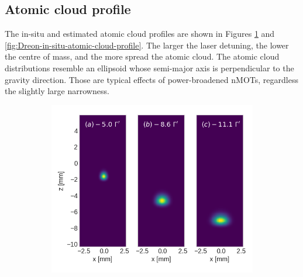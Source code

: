 \subsection{Atomic cloud profile}
\label{sec:cloud-profile-dysprosium}

The in-situ and estimated atomic cloud profiles are shown in Figures \ref{fig:Dreon-simulated-atomic-cloud-profile} and \ref{fig:Dreon-in-situ-atomic-cloud-profile}. The larger the laser detuning, the lower the centre of mass, and the more spread the atomic cloud. The atomic cloud distributions resemble an ellipsoid whose semi-major axis is perpendicular to the gravity direction. Those are typical effects of power-broadened nMOTs, regardless the slightly large narrowness.

\begin{figure}[!ht]
    \centering
    \begin{subfigure}[b]{0.5\linewidth}
        \centering
        \includegraphics[width=\textwidth]{USPSC-img/dy_dreon_cloud_profile.png}
        \label{fig:Dreon-simulated-atomic-cloud-profile}
    \end{subfigure}
    \hspace{20px}
    \begin{subfigure}[b]{0.4\linewidth}
        \centering

\end{subfigure}
\end{figure}
